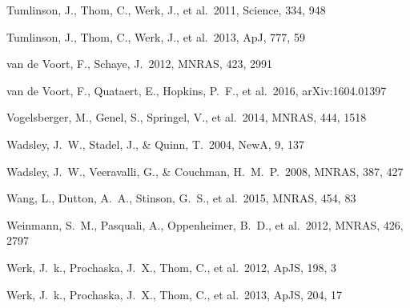 \documentclass[useAMS,usenatbib]{mn2e}
\def \apj {ApJ}
\def \mnras {MNRAS}
\def \apjs {ApJS}
\def \na {NewA}
\begin{document}
\begin{thebibliography}{}
 Tumlinson, J., Thom, C., Werk, J., et al.\ 2011, Science, 334, 948

 Tumlinson, J., Thom, C., Werk, J., et al.\ 2013, \apj, 777, 59


 van de Voort, F., Schaye, J.\ 2012, \mnras, 423, 2991

 van de Voort, F., Quataert, E., Hopkins, P.~F., et al.\ 2016, arXiv:1604.01397

 Vogelsberger, M., 
Genel, S., Springel, V., et al.\ 2014, \mnras, 444, 1518 



 Wadsley, J.~W., Stadel, 
J., \& Quinn, T.\ 2004, \na, 9, 137 

 Wadsley, J.~W., 
Veeravalli, G., \& Couchman, H.~M.~P.\ 2008, \mnras, 387, 427 

 Wang, L., Dutton, A.~A.,  Stinson, G.~S., et al.\ 2015, \mnras, 454, 83

   Weinmann, S.~M., Pasquali, A., Oppenheimer, B.~D., et al.\ 2012, \mnras, 426, 2797 

 Werk, J.~k., Prochaska, J.~X., Thom, C., et al.\ 2012, \apjs, 198, 3

 Werk, J.~k., Prochaska, J.~X., Thom, C., et al.\ 2013, \apjs, 204, 17


\end{thebibliography}
\end{document}
